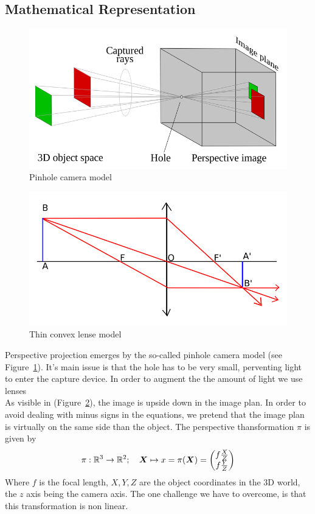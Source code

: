 \subsection{Mathematical Representation}%
\label{sub:mathematical_representation}


\begin{figure}[h]
\centering
\includegraphics[width=0.5\columnwidth]{assets/img/pinhole_camera.png}
\caption{Pinhole camera model}%
\label{fig:pinhole_camera}
\end{figure}

\begin{figure}[h]
\centering
\includegraphics[width=0.5\columnwidth]{assets/img/convex_lense.png}
\caption{Thin convex lense model}%
\label{fig:convex_lense}
\end{figure}

Perspective projection emerges by the so-called pinhole camera model
(see Figure~\ref{fig:pinhole_camera}).
It's main issue is that the hole has to be very small,
perventing light to enter the capture device.
In order to augment the the amount of light we use lenses\\

As visible in (Figure~\ref{fig:convex_lense}), the image is upside down
in the image plan. In order to avoid dealing with minus signs in the
equations, we pretend that the image plan is virtually on the same
side than the object. The perspective thansformation $\pi$ is given by
\[ \pi : \mathbb{R}^3 \rightarrow \mathbb{R}^2; \quad
	\bm{X} \mapsto x = \pi(\bm{X}) =
	\begin{pmatrix}
		f \frac{X}{Z} \\
		f \frac{Y}{Z} \\
	\end{pmatrix}
\]
Where $f$ is the focal length, $X,Y,Z$ are the object coordinates
in the 3D world, the $z$ axis being the camera axis.
The one challenge we have to overcome, is that this transformation is non linear.\\


